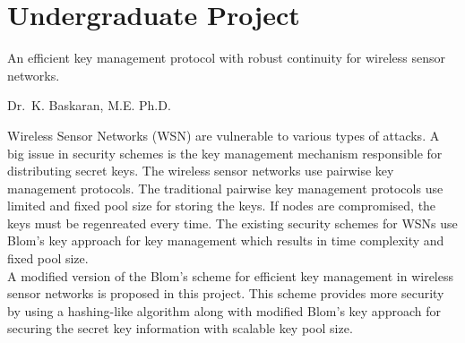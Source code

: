 \documentclass{cv}
\begin{document}
\section{Undergraduate Project}
\begin{description}[leftmargin=50pt,labelwidth=50pt]
  \item[Title] An efficient key management protocol with robust continuity for wireless sensor networks.
  \item[Guide] Dr.\ K. Baskaran, M.E. Ph.D.
  \item[] Wireless Sensor Networks (WSN) are vulnerable to various types of attacks.  A big issue in security schemes is the key management mechanism responsible for distributing secret keys.  The wireless sensor networks use pairwise key management protocols.  The traditional pairwise key management protocols use limited and fixed pool size for storing the keys.  If nodes are compromised, the keys must be regenreated every time.  The existing security schemes for WSNs use Blom's key approach for key management which results in time complexity and fixed pool size.\\
    A modified version of the Blom's scheme for efficient key management in wireless sensor networks is proposed in this project.  This scheme provides more security by using a hashing-like algorithm along with modified Blom's key approach for securing the secret key information with scalable key pool size.
\end{description}
\end{document}
